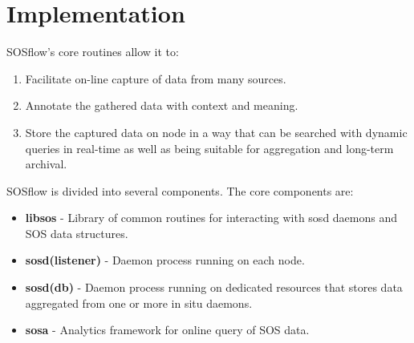 \section{Implementation}
SOSflow's core routines allow it to:
%
\begin{enumerate}
    \item Facilitate on-line capture of data from many sources.
    \item Annotate the gathered data with context and meaning.
    \item Store the captured data on node in a way that can be
      searched with dynamic queries in real-time as well as being
      suitable for aggregation and long-term archival.
\end{enumerate}
SOSflow is divided into several components.  The core components are:
%
\begin{itemize}
    \item \textbf{libsos} - Library of common routines for interacting with
      sosd daemons and SOS data structures.
    \item \textbf{sosd(listener)} - Daemon process running on each node.
    \item \textbf{sosd(db)} - Daemon process running on dedicated resources
      that stores data aggregated from one or more in situ daemons.
    \item \textbf{sosa} - Analytics framework for online query of SOS data.
\end{itemize}

